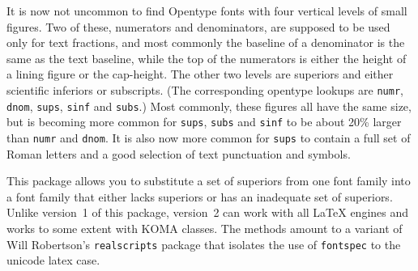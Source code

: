 \documentclass[11pt]{article}
\begin{document}
It is now not uncommon to find Opentype fonts with four vertical levels of small figures. Two of these, numerators and denominators, are supposed to be used only for text fractions, and most commonly the baseline of a denominator is the same as the text baseline, while the top of the numerators is either the height of a lining figure or the cap-height. The other two levels are superiors and either scientific inferiors or  subscripts. (The corresponding opentype lookups are {\tt numr}, {\tt dnom}, {\tt sups}, {\tt sinf} and {\tt subs}.) Most commonly, these figures all have the same size, but is becoming more common for {\tt sups}, {\tt subs} and {\tt sinf} to be about 20\% larger than {\tt numr} and {\tt dnom}. It is also now more common for {\tt sups} to contain a full set of Roman letters and a good selection of text punctuation and symbols. 

This package allows you to substitute a set of superiors  from one font family into a font family that either lacks superiors or has an inadequate set of superiors. Unlike version~1 of this package, version~2 can work with all LaTeX engines and works to some extent with KOMA classes. The methods amount to a variant of Will Robertson's {\tt realscripts} package that isolates the use of {\tt fontspec} to the unicode latex case.
\end{document}
